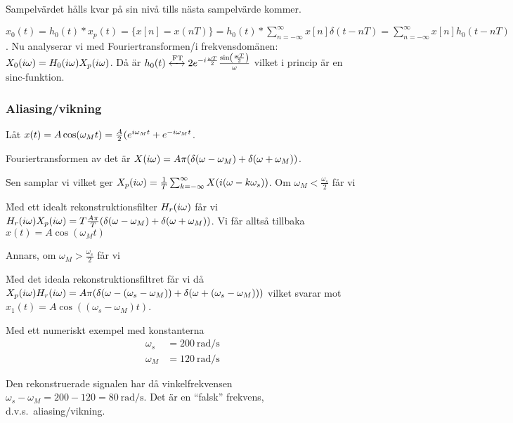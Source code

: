 \documentclass[a4paper]{article}
\begin{document}
\f

Sampelvärdet hålls kvar på sin nivå tills nästa sampelvärde kommer.

\f

\(
    x_0(t) = h_0(t) * x_p(t)
           = \{x[n] = x(nT)\}
           = h_0(t) * \sum_{n=-\infty}^\infty x[n] \delta(t-nT)
           = \sum_{n=-\infty}^\infty x[n] h_0(t-nT)
\). Nu analyserar vi med Fouriertransformen/i frekvensdomänen: \(
    X_0(i\omega) = H_0(i\omega) X_p(i\omega)
\). Då är \(
    h_0(t) \xleftrightarrow{\text{FT}} 2e^{-i \frac{\omega T}{2} } \frac{\sin(\frac{\omega T}{2} )}{\omega} 
\) vilket i princip är en \(
    \text{sinc} 
\)-funktion.

\subsubsection{Aliasing/vikning}
\begin{ex}
    Låt \(
        x(t) = A \cos(\omega_M t) = \frac{A}{2} (e^{i\omega_M t} + e^{-i\omega_M t}
    \).

    Fouriertransformen av det är \(
        X(i\omega) = A \pi (\delta(\omega - \omega_M) + \delta(\omega+\omega_M))
    \).

    \f

    Sen samplar vi vilket ger \(
        X_p(i\omega) = \frac{1}{T} \sum_{k=-\infty}^\infty X(i(\omega - k \omega_s))
    \). Om \(
        \omega_M < \frac{\omega_s}{2} 
    \) får vi 

    \f

    Med ett idealt rekonstruktionsfilter \(
        H_r(i\omega)
    \) får vi \(
        H_r(i\omega) X_p(i\omega) 
            = T \frac{A \pi}{T} (\delta(\omega-\omega_M) + \delta(\omega+\omega_M))
    \). Vi får alltså tillbaka \(
        x(t) = A \cos(\omega_M t)
    \) 

    Annars, om \(
        \omega_M > \frac{\omega_s}{2}
    \) får vi  

    \f

    Med det ideala rekonstruktionsfiltret får vi då \(
        X_p(i\omega) H_r(i\omega) 
            = A \pi (\delta(\omega-(\omega_s-\omega_M)) + \delta(\omega+(\omega_s - \omega_M)))
    \) vilket svarar mot \(
        x_1(t) = A \cos((\omega_s-\omega_M) t)
    \). 

    Med ett numeriskt exempel med konstanterna 
    \begin{align*}
        \omega_s &= \SI{200}{\radian\per\second} \\
        \omega_M &= \SI{120}{\radian\per\second} 
    \end{align*}

    Den rekonstruerade signalen har då vinkelfrekvensen \(
        \omega_s-\omega_M = 200-120= \SI{80}{\radian\per\second}
    \). Det är en \enquote{falsk} frekvens, d.v.s.\ aliasing/vikning.
\end{ex}
\end{document}
